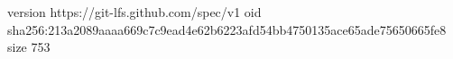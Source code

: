 version https://git-lfs.github.com/spec/v1
oid sha256:213a2089aaaa669c7c9ead4e62b6223afd54bb4750135ace65ade75650665fe8
size 753
